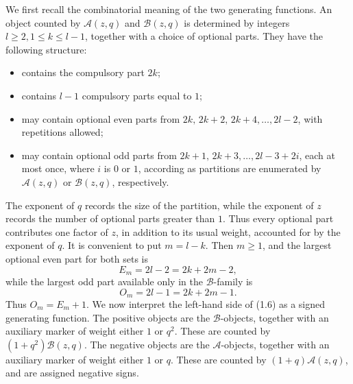 \documentclass[reqno]{amsart}
\theoremstyle{definition}
\theoremstyle{plain}
\theoremstyle{remark}
\numberwithin{equation}{section}
\begin{document}
We first recall the combinatorial meaning of the two generating functions.
An object counted by \(\mathcal A(z,q)\) and $\mathcal B(z,q)$ is determined by integers $l\ge2, 1\le k\le l-1$, together with a choice of optional parts. They have the following structure:
\begin{itemize}
    \item contains the compulsory part \(2k\);
    \item contains \(l-1\) compulsory parts equal to \(1\);
    \item may contain optional even parts from $2k,\,2k+2,\,2k+4,\ldots,2l-2$, with repetitions allowed;
    \item may contain optional odd parts from $2k+1,\,2k+3,\ldots,2l-3+2i$, each at most once, where $i$ is $0$ or $1$, according as partitions are enumerated by $\mathcal{A}(z,q)$ or $\mathcal{B}(z,q)$, respectively.
\end{itemize} 
The exponent of \(q\) records the size of the partition, while the exponent
of \(z\) records the number of optional parts greater than \(1\).  Thus every
optional part contributes one factor of \(z\), in addition to its usual weight, accounted for by the exponent of $q$. It is convenient to put $m=l-k$. Then \(m\ge1\), and the largest optional even part for both sets is
\[
E_m=2l-2=2k+2m-2,
\]
while the largest odd part available only in the \(\mathcal{B}\)-family is
\[
O_m=2l-1=2k+2m-1.
\]
Thus \(O_m=E_m+1\). We now interpret the left-hand side of (1.6) as a signed generating function.  The positive objects are the \(\mathcal B\)-objects,
together with an auxiliary marker of weight either \(1\) or \(q^2\). These
are counted by $(1+q^2)\mathcal B(z,q)$. The negative objects are the \(\mathcal A\)-objects, together with an auxiliary marker
of weight either \(1\) or \(q\). These are counted by $(1+q)\mathcal A(z,q)$, and are assigned negative signs.
\end{document}
